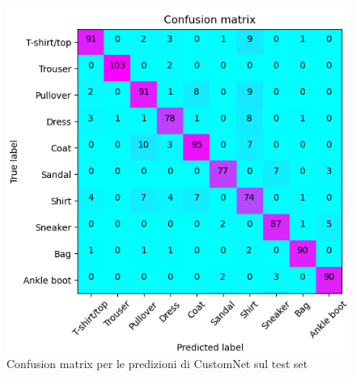 \begin{figure}[!hbt]
    \centering
    \includegraphics[width=\columnwidth]{images/confusion_matrix1.png}
    \caption{Confusion matrix per le predizioni di CustomNet sul test set}
    \label{fig11:confusion_matrix}
\end{figure}

